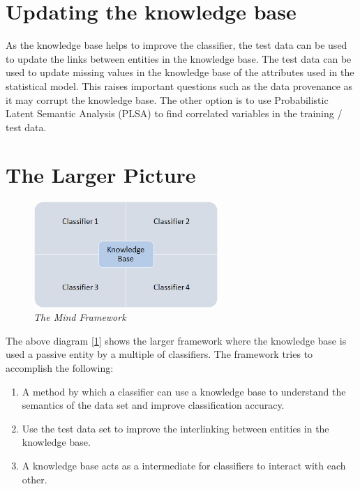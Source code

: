 \documentclass[paper=a4, fontsize=11pt]{scrartcl}
\numberwithin{equation}{section}
\numberwithin{figure}{section}
\numberwithin{table}{section}
\begin{document}
\section{Updating the knowledge base}
As the knowledge base helps to improve the classifier, the test data can be used to update the links between entities in the knowledge base. The test data can be used to update missing values in the knowledge base of the attributes used in the statistical model. This raises important questions such as the data provenance as it may corrupt the knowledge base. The other option is to use Probabilistic Latent Semantic Analysis (PLSA) \cite{hofmann1999probabilistic} to find correlated variables in the training / test data.

\section{The Larger Picture}
\begin{figure}[h]
	\centering
	\includegraphics[width=7cm,height=4cm]{big_picture.png}
	\caption{\textit{The Mind Framework}}
	\label{lp}
\end{figure}

The above diagram [\ref{lp}] shows the larger framework where the knowledge base is used a passive entity by a multiple of classifiers. The framework tries to accomplish the following:
\begin{enumerate}
\item A method by which a classifier can use a knowledge base to understand the semantics of the data set and improve classification accuracy.
\item Use the test data set to improve the interlinking between entities in the knowledge base.
\item A knowledge base acts as a intermediate for classifiers to interact with each other.
\end{enumerate}

{}

\end{document}
